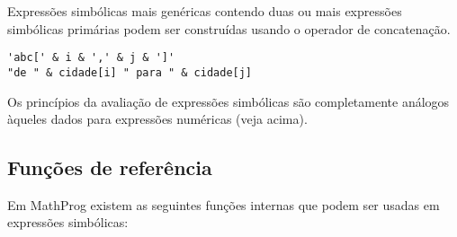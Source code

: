 \documentclass[11pt, brazil]{report}
\def\para#1{\noindent{\bf#1}}
\begin{document}

Expressões simbólicas mais genéricas contendo duas ou mais expressões
simbólicas primárias podem ser construídas usando o operador de
concatenação.


\para{Exemplos}

\begin{verbatim}
'abc[' & i & ',' & j & ']'
"de " & cidade[i] " para " & cidade[j]
\end{verbatim}


Os princípios da avaliação de expressões simbólicas são completamente
análogos àqueles dados para expressões numéricas (veja acima).


\subsection{Funções de referência}

Em MathProg existem as seguintes funções internas que podem ser usadas em
expressões \linebreak simbólicas:

\end{document}
